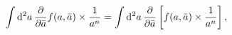 \begin{equation}
\int {\rm d}^2 a \, {\partial \over \partial \bar a}  f(a,\bar a)
\times { 1 \over a^n} = \int {\rm d}^2 a \, {\partial \over
\partial \bar a} \left[ f(a,\bar a) \times { 1 \over a^n} \right] ,
\end{equation}

